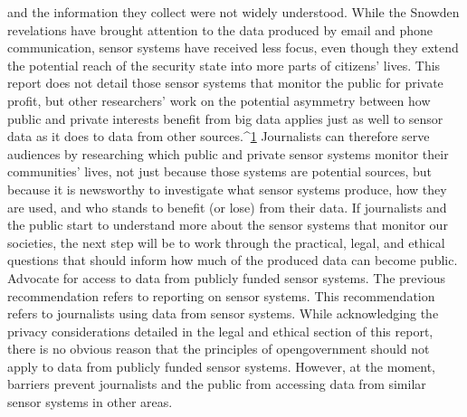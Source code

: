 and the information they collect were not widely understood. While the
Snowden revelations have brought attention to the data produced by email
and phone communication, sensor systems have received less focus, even
though they extend the potential reach of the security state into more parts
of citizens' lives.
This report does not detail those sensor systems that monitor the public for
private profit, but other researchers' work on the potential asymmetry
between how public and private interests benefit from big data applies just
as well to sensor data as it does to data from other sources.^{\href{#endnotes-stauffer}{1}} Journalists can
therefore serve audiences by researching which public and private sensor
systems monitor their communities' lives, not just because those systems
are potential sources, but because it is newsworthy to investigate what sensor
systems produce, how they are used, and who stands to benefit (or lose)
from their data. If journalists and the public start to understand more about
the sensor systems that monitor our societies, the next step will be to work
through the practical, legal, and ethical questions that should inform how
much of the produced data can become public.
Advocate for access to data from publicly funded sensor systems.
The previous recommendation refers to reporting on sensor systems. This
recommendation refers to journalists using data from sensor systems. While
acknowledging the privacy considerations detailed in the legal and ethical
section of this report, there is no obvious reason that the principles of opengovernment
should not apply to data from publicly funded sensor systems.
However, at the moment, barriers prevent journalists and the public from
accessing data from similar sensor systems in other areas.

